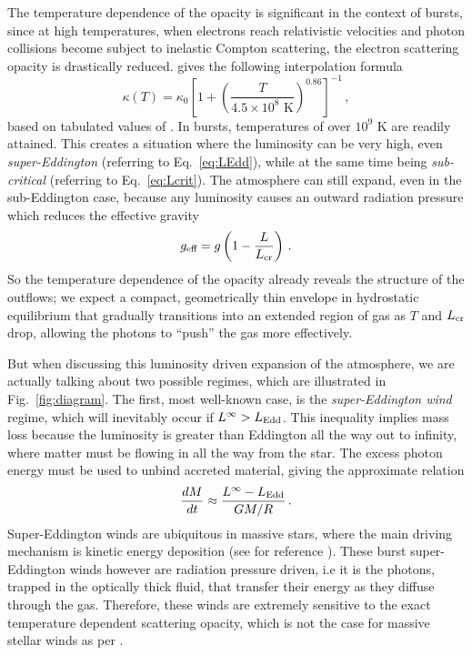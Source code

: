 \documentclass[../main.tex]{subfiles}
\begin{document}
The temperature dependence of the opacity is significant in the context of bursts, since at high temperatures, when electrons reach relativistic velocities and photon collisions become subject to inelastic Compton scattering, the electron scattering opacity is drastically reduced. \citet{Paczynski1983} gives the following interpolation formula
\begin{equation}\label{eq:kappa}
    \kappa(T)=\kappa_0 \left[1+\left(\frac{T}{4.5\times 10^8 \text{ K}}\right)^{0.86}\right]^{-1}\,,
\end{equation}
based on tabulated values of \citet{Buchler1976}. In bursts, temperatures of over $10^9$ K are readily attained. This creates a situation where the luminosity can be very high, even \textit{super-Eddington} (referring to Eq.~\ref{eq:LEdd}), while at the same time being \textit{sub-critical} (referring to Eq.~\ref{eq:Lcrit}). The atmosphere can still expand, even in the sub-Eddington case, because any luminosity causes an outward radiation pressure which reduces the effective gravity
\begin{equation}\label{eq:geff}
    g_\text{eff}=g\left(1-\frac{L}{L_\text{cr}}\right)\,.
\end{equation}
So the temperature dependence of the opacity already reveals the structure of the outflows; we expect a compact, geometrically thin envelope in hydrostatic equilibrium that gradually transitions into an extended region of gas as $T$ and $L_\text{cr}$ drop, allowing the photons to ``push'' the gas more effectively. 

But when discussing this luminosity driven expansion of the atmosphere, we are actually talking about two possible regimes, which are illustrated in Fig.~\ref{fig:diagram}. The first, most well-known case, is the \textit{super-Eddington wind} regime, which will inevitably occur if $L^\infty>L_\text{Edd}$. This inequality implies mass loss because the luminosity is greater than Eddington all the way out to infinity, where matter must be flowing in all the way from the star. The excess photon energy must be used to unbind accreted material, giving the approximate relation
\begin{equation}
    \frac{dM}{dt}\approx \frac{L^\infty-L_\text{Edd}}{GM/R}\,.
\end{equation}
Super-Eddington winds are ubiquitous in massive stars, where the main driving mechanism is kinetic energy deposition (see for reference \citet{Quataert2016}).  These burst super-Eddington winds however are radiation pressure driven, i.e it is the photons, trapped in the optically thick fluid, that transfer their energy as they diffuse through the gas. Therefore, these winds are extremely sensitive to the exact temperature dependent scattering opacity, which is not the case for massive stellar winds as per \citet{Quataert2016}. 
\end{document}
